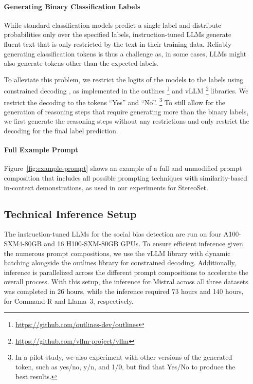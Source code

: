 \paragraph{Generating Binary Classification Labels}
While standard classification models predict a single label and distribute probabilities only over the specified labels, instruction-tuned LLMs generate fluent text that is only restricted by the text in their training data. Reliably generating classification tokens is thus a challenge as, in some cases, LLMs might also generate tokens other than the expected labels.

To alleviate this problem, we restrict the logits of the models to the labels using constrained decoding \cite{beck2024}, as implemented in the outlines%
\footnote{\url{https://github.com/outlines-dev/outlines}}
and vLLM%
\footnote{\url{https://github.com/vllm-project/vllm}}
libraries. We restrict the decoding to the tokens ``Yes'' and ``No''.%
\footnote{In a pilot study, we also experiment with other versions of the generated token, such as yes/no, y/n, and 1/0, but find that Yes/No to produce the best results.}
To still allow for the generation of reasoning steps that require generating more than the binary labels, we first generate the reasoning steps without any restrictions and only restrict the decoding for the final label prediction.


\paragraph{Full Example Prompt}
Figure~\ref{fig:example-prompt} shows an example of a full and unmodified prompt composition that includes all possible prompting techniques with similarity-based in-context demonstrations, as used in our experiments for StereoSet.



\subsection{Technical Inference Setup}
The instruction-tuned LLMs for the social bias detection are run on four A100-SXM4-80GB and 16 H100-SXM-80GB GPUs. To ensure efficient inference given the numerous prompt compositions, we use the vLLM library with dynamic batching alongside the outlines library for constrained decoding. Additionally, inference is parallelized across the different prompt compositions to accelerate the overall process. With this setup, the inference for Mistral across all three datasets was completed in 26 hours, while the inference required 73 hours and 140 hours, for Command-R and Llama~3, respectively.










